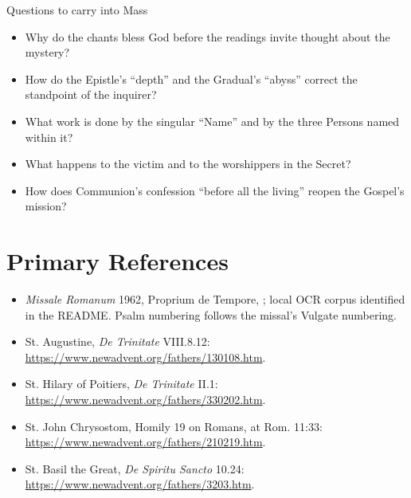 \begin{massbox}{Questions to carry into Mass}
\begin{itemize}
\item Why do the chants bless God before the readings invite thought about the mystery?
\item How do the Epistle's ``depth'' and the Gradual's ``abyss'' correct the standpoint of the inquirer?
\item What work is done by the singular ``Name'' and by the three Persons named within it?
\item What happens to the victim and to the worshippers in the Secret?
\item How does Communion's confession ``before all the living'' reopen the Gospel's mission?
\end{itemize}
\end{massbox}

\sectionguard
\section*{Primary References}
\begin{itemize}
\item \emph{Missale Romanum} 1962, Proprium de Tempore, ; local OCR corpus identified in the README. Psalm numbering follows the missal's Vulgate numbering.
\item St. Augustine, \emph{De Trinitate} VIII.8.12: \url{https://www.newadvent.org/fathers/130108.htm}.
\item St. Hilary of Poitiers, \emph{De Trinitate} II.1: \url{https://www.newadvent.org/fathers/330202.htm}.
\item St. John Chrysostom, Homily 19 on Romans, at Rom. 11:33: \url{https://www.newadvent.org/fathers/210219.htm}.
\item St. Basil the Great, \emph{De Spiritu Sancto} 10.24: \url{https://www.newadvent.org/fathers/3203.htm}.
\end{itemize}


